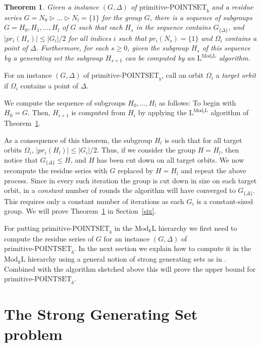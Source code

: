 \documentclass[11pt]{article}
\newtheorem{theorem}{Theorem}[section]
\newtheorem{definition}[theorem]{Definition}
\newcommand{\ModKL}[1]{\ensuremath{\mathrm{Mod}_{#1}\mathrm{L}}}
\newcommand{\Mod}[1]{\ensuremath{\mathrm{Mod}_{#1}\mathrm{L}}}
\newcommand{\Lo}{\ensuremath{\mathrm{L}}}
\newcommand{\prpsb}[1]{\ensuremath{\textrm{primitive-POINTSET}_{#1}}}
\newcommand{\pr}[2]{\ensuremath{pr_{#1}\left({#2}\right)}}
\begin{document}
\begin{theorem}\label{thm-cutting-down}
Given a instance $(G,\Delta)$ of $\prpsb{b}$ and a residue series $G =
N_0 \rhd \ldots \rhd N_l=\{1\}$ for the group $G$, there is a sequence of
subgroups $G=H_0,H_1,\ldots,H_l$ of $G$ such that each $H_s$ in the
sequence contains $G_{\{\Delta\}}$, and $|\pr{i}{H_s}|\leq
|G_i|/2$ for all indices $i$ such that $\pr{i}{N_s}=\{1\}$ and
$\Omega_i$ contains a point of $\Delta$. Furthermore, for each $s\geq
0$, given the subgroup $H_{s}$ of this sequence by a generating set
the subgroup $H_{s+1}$ can be computed by an $\Lo^{\ModKL{t}}$
algorithm.
\end{theorem}

For an instance $(G,\Delta)$ of $\prpsb{b}$, call an orbit $\Omega_i$
a \emph{target orbit} if $\Omega_i$ contains a point of $\Delta$.

We compute the sequence of subgroups $H_0, \ldots, H_{l}$ as follows:
To begin with $H_0 = G$. Then, $H_{i+1}$ is computed from $H_i$ by
applying the $\Lo^{\ModKL{t}}$ algorithm of
Theorem~\ref{thm-cutting-down}.

As a consequence of this theorem, the subgroup $H_{l}$ is such that
for all target orbits $\Omega_i$, $|\pr{i}{H_l}|\leq |G_i|/2$. Thus,
if we consider the group $H=H_l$, then notice that $G_{\{\Delta\}}\leq
H$, and $H$ has been cut down on all target orbits. We now recompute
the residue series with $G$ replaced by $H=H_l$ and repeat the above
process.  Since in every such iteration the group is cut down in size
on each target orbit, in a \emph{constant} number of rounds the
algorithm will have converged to $G_{\{\Delta\}}$. This requires only
a constant number of iterations as each $G_i$ is a constant-sized
group. We will prove Theorem~\ref{thm-cutting-down} in
Section~\ref{six}.

For putting $\prpsb{b}$ in the $\Mod{k}$ hierarchy we first need to
compute the residue series of $G$ for an instance $(G,\Delta)$ of
$\prpsb{b}$. In the next section we explain how to compute it in the
$\Mod{k}$ hierarchy using a general notion of strong generating sets
as in \cite{LM}. Combined with the algorithm sketched above this
will prove the upper bound for $\prpsb{b}$.

\section{The Strong Generating Set problem}\label{five}

\end{document}
